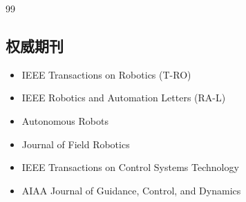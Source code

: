 \documentclass[12pt,a4paper]{ctexart}
\begin{document}
\begin{thebibliography}{99}
\subsection{权威期刊}

\begin{itemize}
    \item IEEE Transactions on Robotics (T-RO)
    \item IEEE Robotics and Automation Letters (RA-L)
    \item Autonomous Robots
    \item Journal of Field Robotics
    \item IEEE Transactions on Control Systems Technology
    \item AIAA Journal of Guidance, Control, and Dynamics
\end{itemize}

\end{thebibliography}
\end{document}
